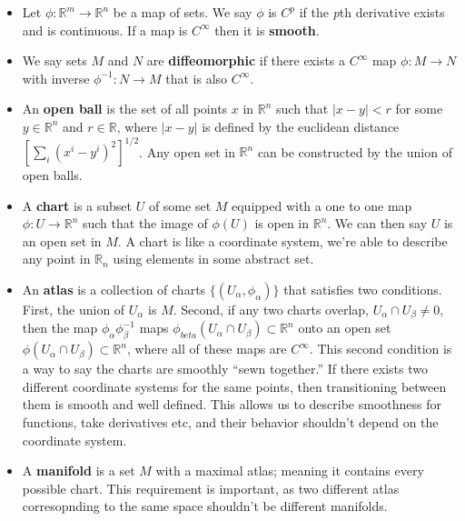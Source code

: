\documentclass[11pt]{article}
\begin{document}
\begin{itemize}
    \item Let \( \phi \colon \mathbb{R}^{m} \rightarrow \mathbb{R}^{n} \) be a map of sets. We say \( \phi \) is \( C^{p} \) if the \textit{p}th derivative exists and is continuous. If a map is \( C^{\infty} \) then it is \textbf{smooth}.
    
    \item We say sets \( M \) and \( N \) are \textbf{diffeomorphic} if there exists a \( C^{\infty} \) map \( \phi \colon M \rightarrow N \) with inverse \( \phi^{-1} \colon N \rightarrow M \) that is also \( C^{\infty} \).
    
    \item An \textbf{open ball} is the set of all points \( x \) in \( \mathbb{R}^{n} \) such that \( |x - y| < r \) for some \( y \in \mathbb{R}^{n} \) and \( r \in \mathbb{R} \), where \( |x - y| \) is defined by the euclidean distance \( [\sum_{i}(x^{i} - y^{i})^{2}]^{1 / 2} \). Any open set
    in \( \mathbb{R}^{n} \) can be constructed by the union of open balls. 
    
    \item A \textbf{chart} is a subset \( U \) of some set \( M \) equipped with a one to one map \( \phi \colon U \rightarrow \mathbb{R}^{n} \) such that the image of \( \phi(U) \) is open in \( \mathbb{R}^{n} \). We can then say \( U \) is an open set in \( M \). A chart is like a coordinate system,
    we're able to describe any point in \( \mathbb{R}_{n} \) using elements in some abstract set.
    
    \item An \textbf{atlas} is a collection of charts \( \{(U_{\alpha}, \phi_{\alpha})\}  \) that satisfies two conditions. First, the union of \( U_{\alpha} \) is \( M \). Second, if any two charts overlap, \( U_{\alpha} \cap U_{\beta} \neq 0\), then the map \( \phi_{\alpha} \phi_{\beta}^{-1} \)
    maps \( \phi_{beta}(U_{\alpha} \cap U_{\beta}) \subset \mathbb{R}^{n} \) onto an open set \( \phi(U_{\alpha} \cap U_{\beta}) \subset \mathbb{R}^{n} \), where all of these maps are \( C^{\infty} \). This second condition is a way to say the charts are smoothly ``sewn together.'' If there exists
    two different coordinate systems for the same points, then transitioning between them is smooth and well defined. This allows us to describe smoothness for functions, take derivatives etc, and their behavior shouldn't depend on the coordinate system. 

    \item A \textbf{manifold} is a set \( M \) with a maximal atlas; meaning it contains every possible chart. This requirement is important, as two different atlas corresopnding to the same space shouldn't be different manifolds.
\end{itemize}
\end{document}
